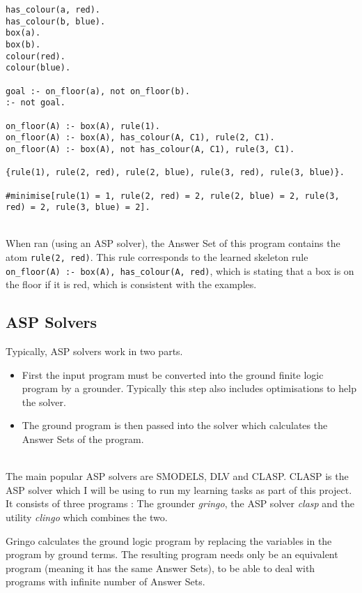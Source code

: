 \begin{lstlisting}
has_colour(a, red).
has_colour(b, blue).
box(a).
box(b).
colour(red).
colour(blue).

goal :- on_floor(a), not on_floor(b).
:- not goal.

on_floor(A) :- box(A), rule(1).
on_floor(A) :- box(A), has_colour(A, C1), rule(2, C1).
on_floor(A) :- box(A), not has_colour(A, C1), rule(3, C1).

{rule(1), rule(2, red), rule(2, blue), rule(3, red), rule(3, blue)}.

#minimise[rule(1) = 1, rule(2, red) = 2, rule(2, blue) = 2, rule(3, red) = 2, rule(3, blue) = 2].
\end{lstlisting}
\mbox{}\\
When ran (using an ASP solver), the Answer Set of this program contains the atom \lstinline!rule(2, red)!. This rule corresponds to the learned skeleton rule \lstinline!on_floor(A) :- box(A), has_colour(A, red)!, which is stating that a box is on the floor if it is red, which is consistent with the examples.

\subsection{ASP Solvers}

Typically, ASP solvers work in two parts.

\begin{itemize}
\item First the input program must be converted into the ground finite logic program by a grounder. Typically this step also includes optimisations to help the solver.
\item The ground program is then passed into the solver which calculates the Answer Sets of the program.
\end{itemize}
\mbox{}\\
The main popular ASP solvers are SMODELS, DLV and CLASP. CLASP is the ASP solver which I will be using to run my learning tasks as part of this project. It consists of three programs : The grounder \textit{gringo}, the ASP solver \textit{clasp} and the utility \textit{clingo} which combines the two.

Gringo calculates the ground logic program by replacing the variables in the program by ground terms. The resulting program needs only be an equivalent program (meaning it has the same Answer Sets), to be able to deal with programs with infinite number of Answer Sets.

